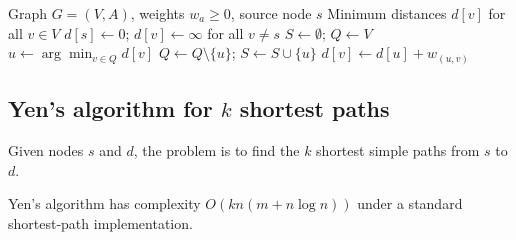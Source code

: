 \begin{algorithm}
\caption{Dijkstra (1959)}
\label{alg:dijkstra}
\begin{algorithmic}[1]
\Require Graph $G=(V,A)$, weights $w_a \geq 0$, source node $s$
\Ensure Minimum distances $d[v]$ for all $v \in V$
\State $d[s] \leftarrow 0$; $d[v] \leftarrow \infty$ for all $v \neq s$
\State $S \leftarrow \emptyset$; $Q \leftarrow V$
    \State $u \leftarrow \arg\min_{v \in Q} d[v]$
    \State $Q \leftarrow Q \setminus \{u\}$; $S \leftarrow S \cup \{u\}$
            \State $d[v] \leftarrow d[u] + w_{(u,v)}$
        \EndIf
    \EndFor
\EndWhile
\end{algorithmic}
\end{algorithm}

\subsection{Yen's algorithm for $k$ shortest paths}

\begin{definition}
Given nodes $s$ and $d$, the problem is to find the $k$ shortest simple paths from $s$ to $d$.
\end{definition}

\begin{proposition}
Yen's algorithm has complexity $O(k n (m + n \log n))$ under a standard shortest-path implementation.
\end{proposition}
